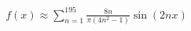\documentclass[preview]{standalone}
\begin{document}
\begin{align*}
f(x) \approx \sum_{n=1}^{195} \frac{8n}{\pi(4n^2-1)} \sin(2nx)
\end{align*}
\end{document}

